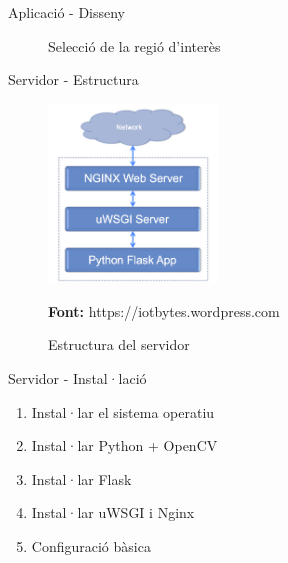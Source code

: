 \documentclass[xcolor=table, 11pt]{beamer}
\newcommand*{\captionsource}[2]{%
  \caption[{#1}]{#1}\par
  \vspace{-0.4cm}
  \tiny{\textbf{Font:} #2\par}}
\newcommand\tz{\fontsize{13}{15.6}\selectfont}
\begin{document}
	\begin{frame}{Aplicació - Disseny}
		\tz
		\centering
		\begin{figure}[H]
			\caption{Selecció de la regió d'interès}
		\end{figure}
	\end{frame}


	\begin{frame}{Servidor - Estructura}
		\tz
		\centering
		\begin{figure}
			\includegraphics[width=0.4\textwidth]{images/server}
			\vspace{0.2cm}
			\captionsource{Estructura del servidor}{https://iotbytes.wordpress.com}
		\end{figure}
	\end{frame}

	\begin{frame}{Servidor - Instal·lació}
		\tz
		\begin{enumerate}
			\item{Instal·lar el sistema operatiu}
			\item{Instal·lar Python + OpenCV}
			\item{Instal·lar Flask}
			\item{Instal·lar uWSGI i Nginx}
			\item{Configuració bàsica}
		\end{enumerate}
	\end{frame}
\end{document}
